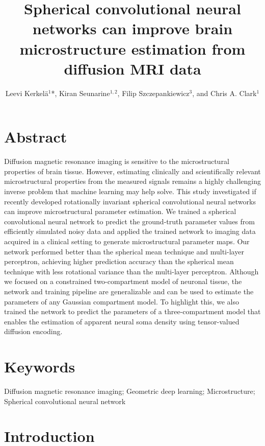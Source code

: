 \documentclass[10pt, letterpaper, oneside]{article}
\title{
	\textbf{Spherical convolutional neural networks can improve brain microstructure estimation from diffusion MRI data}
}
\author{
	Leevi Kerkelä$^1$*, Kiran Seunarine$^{1,2}$, Filip Szczepankiewicz$^3$, and Chris A. Clark$^1$
}
\date{
	\begin{flushleft}
	\scriptsize{
	    $^1$ UCL Great Ormond Street Institute of Child Health, University College London, London, United Kingdom \\
		$^2$ Great Ormond Street Hospital, London, United Kingdom \\
		$^3$ Medical Radiation Physics, Clinical Sciences Lund, Lund University, Lund, Sweden \\
		[2ex]
		* Corresponding author: leevi.kerkela.17@ucl.ac.uk; Developmental Imaging \& Biophysics Section, UCL Great Ormond Street Institute of Child Health, 30 Guilford Street, WC1N 1EH, London, United Kingdom
	}
    \end{flushleft}
}
\begin{document}
\maketitle

\section*{Abstract}

Diffusion magnetic resonance imaging is sensitive to the microstructural properties of brain tissue. However, estimating clinically and scientifically relevant microstructural properties from the measured signals remains a highly challenging inverse problem that machine learning may help solve. This study investigated if recently developed rotationally invariant spherical convolutional neural networks can improve microstructural parameter estimation. We trained a spherical convolutional neural network to predict the ground-truth parameter values from efficiently simulated noisy data and applied the trained network to imaging data acquired in a clinical setting to generate microstructural parameter maps. Our network performed better than the spherical mean technique and multi-layer perceptron, achieving higher prediction accuracy than the spherical mean technique with less rotational variance than the multi-layer perceptron. Although we focused on a constrained two-compartment model of neuronal tissue, the network and training pipeline are generalizable and can be used to estimate the parameters of any Gaussian compartment model. To highlight this, we also trained the network to predict the parameters of a three-compartment model that enables the estimation of apparent neural soma density using tensor-valued diffusion encoding.

\section*{Keywords}

Diffusion magnetic resonance imaging; Geometric deep learning; Microstructure; Spherical convolutional neural network

\thispagestyle{empty}

\newpage


\section{Introduction}
\end{document}
